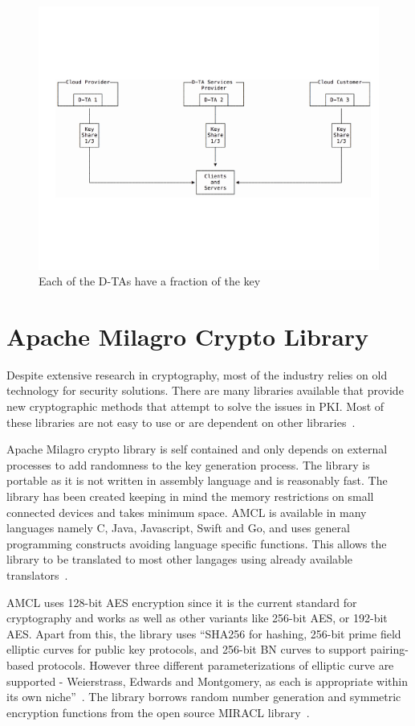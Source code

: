 \begin{figure}[!ht]
  \centering\includegraphics[width=\columnwidth]{../images/dta.pdf}
  \caption{Each of the D-TAs have a fraction of the key~\cite{dta-image}
  }\label{f:fig1}
\end{figure}

\section{Apache Milagro Crypto Library}
Despite extensive research in cryptography, most of the industry
relies on old technology for security solutions. There are many
libraries available that provide new cryptographic methods that
attempt to solve the issues in PKI\@. Most of these libraries are not
easy to use or are dependent on other
libraries~\cite{mcl-white-paper}.

Apache Milagro crypto library is self contained and only depends on
external processes to add randomness to the key generation
process. The library is portable as it is not written in assembly
language and is reasonably fast. The library has been created keeping
in mind the memory restrictions on small connected devices and takes
minimum space. AMCL is available in many languages namely C, Java,
Javascript, Swift and Go, and uses general programming constructs
avoiding language specific functions. This allows the library to be
translated to most other langages using already available
translators~\cite{mcl-white-paper}.

AMCL uses 128-bit AES encryption since it is the current standard for
cryptography and works as well as other variants like 256-bit AES, or
192-bit AES\@. Apart from this, the library uses ``SHA256 for hashing,
256-bit prime field elliptic curves for public key protocols, and
256-bit BN curves to support pairing-based protocols. However three
different parameterizations of elliptic curve are supported -
Weierstrass, Edwards and Montgomery, as each is appropriate within its
own niche''~\cite{mcl-white-paper}. The library borrows random number
generation and symmetric encryption functions from the open source
MIRACL library~\cite{mcl-white-paper}.


